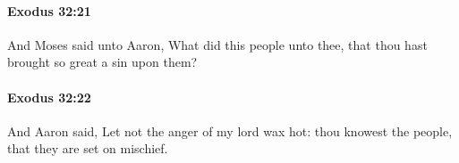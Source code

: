 		\paragraph{Exodus 32:21} %
			\label{EXODUS-32-21}

			And Moses said unto Aaron, What did this people unto thee, that thou hast brought so great a sin upon them?


		\paragraph{Exodus 32:22} %
			\label{EXODUS-32-22}

			And Aaron said, Let not the anger of my lord wax hot: thou knowest the people, that they are set on mischief.


